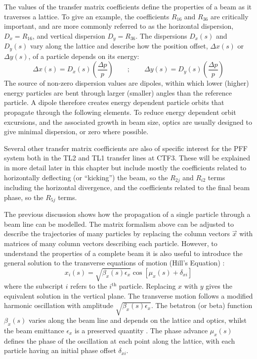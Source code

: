 The values of the transfer matrix coefficients define the properties of a beam as it traverses a lattice. To give an example, the coefficients \(R_{16}\) and \(R_{36}\) are critically important, and are more commonly referred to as the horizontal dispersion, \(D_x = R_{16}\), and vertical dispersion \(D_y = R_{36}\). The dispersions \(D_x(s)\) and \(D_y(s)\) vary along the lattice and describe how the position offset, \(\Delta x(s)\) or \(\Delta y(s)\), of a particle depends on its energy:
\begin{equation}
\Delta x(s) = D_x(s)\left(\frac{\Delta p}{p}\right) 
\qquad\mathrm{;}\qquad
\Delta y(s) = D_y(s)\left(\frac{\Delta p}{p}\right)
\end{equation}
The source of non-zero dispersion values are dipoles, within which lower (higher) energy particles are bent through larger (smaller) angles than the reference particle. A dipole therefore creates energy dependent particle orbits that propagate through the following elements. To reduce energy dependent orbit excursions, and the associated growth in beam size, optics are usually designed to give minimal dispersion, or zero where possible. 

Several other transfer matrix coefficients are also of specific interest for the PFF system both in the TL2 and TL1 transfer lines at CTF3. These will be explained in more detail later in this chapter but include mostly the coefficients related to horizontally deflecting (or ``kicking'') the beam, so the \(R_{2j}\) and \(R_{i2}\) terms including the horizontal divergence, and the coefficients related to the final beam phase, so the \(R_{5j}\) terms.  

The previous discussion shows how the propagation of a single particle through a beam line can be modelled. The matrix formalism above can be adjusted to describe the trajectories of many particles by replacing the column vectors \(\vec{x}\) with matrices of many column vectors describing each particle. However, to understand the properties of a complete beam it is also useful to introduce the general solution to the transverse equations of motion (Hill's Equation) \cite{lee}:
\begin{equation}
x_i(s) = \sqrt{\beta_x(s)\epsilon_x}\cos[\mu_x(s) + \delta_{xi}]
\label{e:twissEqBeta}
\end{equation}
where the subscript \(i\) refers to the \(i^\mathrm{th}\) particle. Replacing \(x\) with \(y\) gives the equivalent solution in the vertical plane. The transverse motion follows a modified harmonic oscillation with amplitude \(\sqrt{\beta_x(s)\epsilon_x}\). The betatron (or beta) function \(\beta_x(s)\) varies along the beam line and depends on the lattice and optics, whilst the beam emittance \(\epsilon_x\) is a preserved quantity \cite{wolski}. The phase advance \(\mu_x(s)\) defines the phase of the oscillation at each point along the lattice, with each particle having an initial phase offset \(\delta_{xi}\). 

